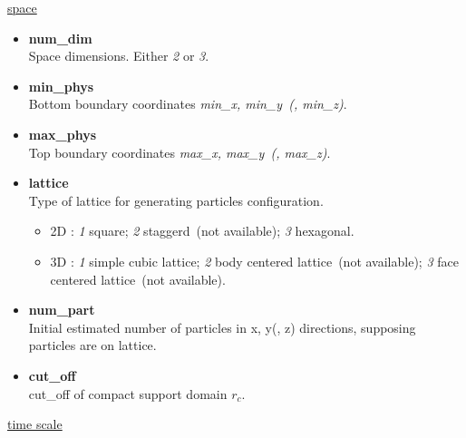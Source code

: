 \documentclass[a4paper,10pt]{article}
\begin{document}
\begin{center}
\underline{\textlangle space \textrangle}
\end{center}

\begin{itemize}
 
\item 
\textbf{num\_dim} \\
Space dimensions. 
Either \textit{2} or \textit{3}.

\item 
\textbf{min\_phys} \\
Bottom boundary coordinates \textit{min\_x, min\_y~(, min\_z)}.

\item 
\textbf{max\_phys} \\
Top boundary coordinates \textit{max\_x, max\_y~(, max\_z)}.

\item
\textbf{lattice}  \\
Type of lattice for generating particles configuration.
\begin{itemize}
\item
2D : \textit{1} square; \textit{2} staggerd~(not available); \textit{3} hexagonal.
\item
3D : \textit{1} simple cubic lattice; \textit{2} body centered lattice~(not available);
\textit{3 }face centered lattice~(not available).
\end{itemize}
\item
\textbf{num\_part}  \\
Initial estimated number of particles 
in x, y(, z) directions,
supposing particles are on lattice.

\item 
\textbf{cut\_off} \\
cut\_off of compact support domain \textbf{$r_c$}.

\end{itemize}


\begin{center}
\underline{\textlangle time scale \textrangle}
\end{center}
\end{document}
